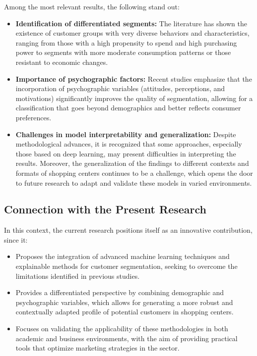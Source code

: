 \documentclass[10pt]{article}
\begin{document}
Among the most relevant results, the following stand out:

\begin{itemize}
    \item \textbf{Identification of differentiated segments:} The literature has shown the existence of customer groups with very diverse behaviors and characteristics, ranging from those with a high propensity to spend and high purchasing power to segments with more moderate consumption patterns or those resistant to economic changes.
    
    \item \textbf{Importance of psychographic factors:} Recent studies emphasize that the incorporation of psychographic variables (attitudes, perceptions, and motivations) significantly improves the quality of segmentation, allowing for a classification that goes beyond demographics and better reflects consumer preferences.
    
    \item \textbf{Challenges in model interpretability and generalization:} Despite methodological advances, it is recognized that some approaches, especially those based on deep learning, may present difficulties in interpreting the results. Moreover, the generalization of the findings to different contexts and formats of shopping centers continues to be a challenge, which opens the door to future research to adapt and validate these models in varied environments.
\end{itemize}

\subsection{Connection with the Present Research}

In this context, the current research positions itself as an innovative contribution, since it:

\begin{itemize}
    \item Proposes the integration of advanced machine learning techniques and explainable methods for customer segmentation, seeking to overcome the limitations identified in previous studies.
    
    \item Provides a differentiated perspective by combining demographic and psychographic variables, which allows for generating a more robust and contextually adapted profile of potential customers in shopping centers.
    
    \item Focuses on validating the applicability of these methodologies in both academic and business environments, with the aim of providing practical tools that optimize marketing strategies in the sector.
\end{itemize}
\end{document}
